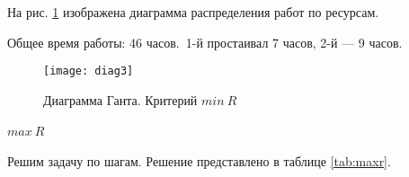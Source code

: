 На рис. \ref{pic:diag3} изображена диаграмма распределения работ по ресурсам.

Общее время работы: 46 часов.\  1-й простаивал 7 часов, 2-й --- 9 часов.

\begin{figure}[H]
\begin{center}
	\texttt{[image: diag3]}
	\caption{Диаграмма Ганта. Критерий $min\ R$}
	\label{pic:diag3}
\end{center}
\end{figure}

\paragraph{$max\ R$} Решим задачу по шагам. Решение представлено в таблице \ref{tab:maxr}.

